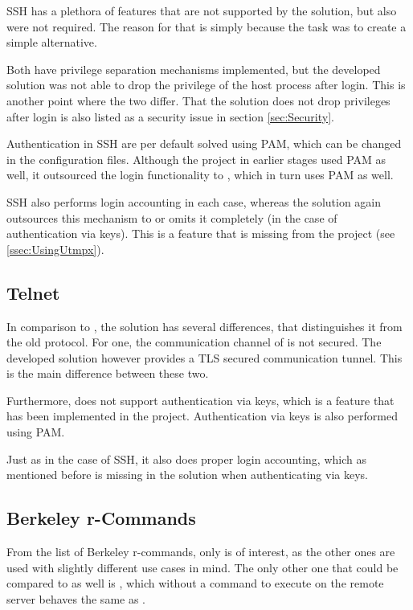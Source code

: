 \documentclass[10pt,a4paper,titlepage,twoside,english,final]{zhawreprt}
\begin{document}
\gls{SSH} has a plethora of features that are not supported by the solution, but also were not required.
The reason for that is simply because the task was to create a simple alternative.

Both have privilege separation mechanisms implemented, but the developed solution was not able to drop the privilege of the host process after \gls{login}.
This is another point where the two differ.
That the solution does not drop privileges after \gls{login} is also listed as a security issue in section \ref{sec:Security}.

Authentication in \gls{SSH} are per default solved using \gls{PAM}, which can be changed in the configuration files.
Although the project in earlier stages used \gls{PAM} as well, it outsourced the \gls{login} functionality to \cite{login}, which in turn uses \gls{PAM} as well.

\gls{SSH} also performs \gls{login} accounting in each case, whereas the solution again outsources this mechanism to \cite{login} or omits it completely (in the case of authentication via keys).
This is a feature that is missing from the project (see \ref{ssec:UsingUtmpx}).

\subsection{Telnet}\label{ssec:CompTelnet}
In comparison to \cite{telnet}, the solution has several differences, that distinguishes it from the old protocol.
For one, the communication channel of \cite{telnet} is not secured.
The developed solution however provides a \gls{TLS} secured communication tunnel.
This is the main difference between these two.

Furthermore, \cite{telnet} does not support authentication via keys, which is a feature that has been implemented in the project.
Authentication via keys is also performed using \gls{PAM}.

Just as in the case of \gls{SSH}, it also does proper \gls{login} accounting, which as mentioned before is missing in the solution when authenticating via keys.

\subsection{Berkeley r-Commands}\label{ssec:BerkeleyRCommands}
From the list of Berkeley r-commands, only \cite{rlogin} is of interest, as the other ones are used with slightly different use cases in mind.
The only other one that could be compared to as well is \cite{rsh}, which without a command to execute on the remote server behaves the same as \cite{rlogin}.
\end{document}
